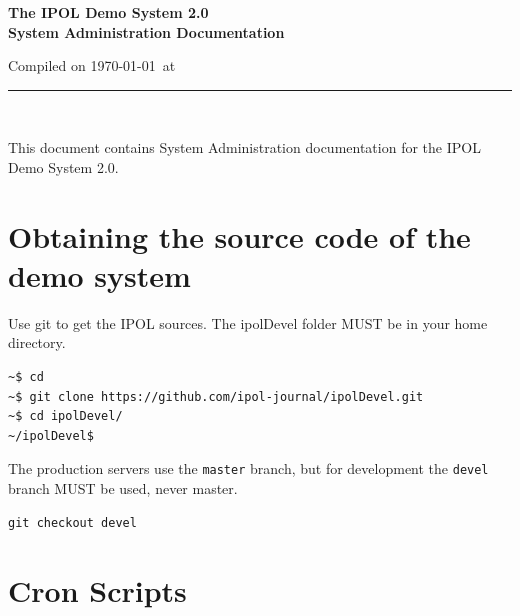 \documentclass[a4paper,12pt]{article}
\begin{document}
\begin{titlepage}

\begin{center}
\vspace*{-1in}

\vspace*{0.6in}
\begin{Large}
\textbf{The IPOL Demo System 2.0 \\System Administration Documentation} \\
\end{Large}

\vspace*{0.6in}

\small{Compiled on \today\ at \currenttime}

\vspace*{0.6in}
\rule{80mm}{0.1mm}\\
\vspace*{0.1in}
\end{center}

\end{titlepage}

This document contains System Administration documentation for the IPOL Demo System 2.0.
\vspace*{0.6in}


\newpage

\tableofcontents
\newpage

\section{Obtaining the source code of the demo system}
Use git to get the IPOL sources. The ipolDevel folder MUST be in your home directory.
\begin{verbatim}
~$ cd
~$ git clone https://github.com/ipol-journal/ipolDevel.git
~$ cd ipolDevel/
~/ipolDevel$
\end{verbatim}

The production servers use the {\tt master} branch, but for development the {\tt devel} branch MUST be used, never master.
\begin{verbatim}
git checkout devel
\end{verbatim}


\section{Cron Scripts}
\end{document}
